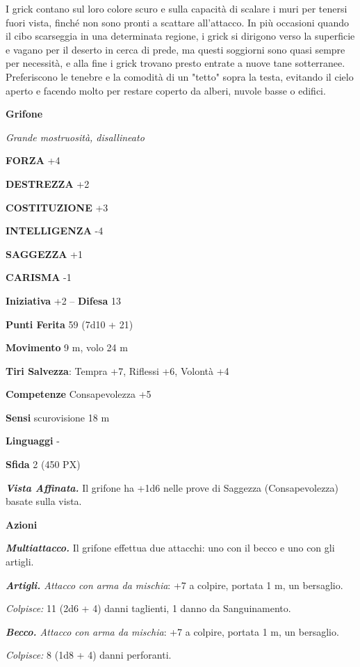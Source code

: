 \begin{multicols}{2}
	I grick contano sul loro colore scuro e sulla capacità di scalare i muri per tenersi fuori vista, finché non sono pronti a scattare all'attacco. In più occasioni quando il cibo scarseggia in una determinata regione, i grick si dirigono verso la superficie e vagano per il deserto in cerca di prede, ma questi soggiorni sono quasi sempre per necessità, e alla fine i grick trovano presto entrate a nuove tane sotterranee. Preferiscono le tenebre e la comodità di un "tetto" sopra la testa, evitando il cielo aperto e facendo molto per restare coperto da alberi, nuvole basse o edifici.


	\medskip{}\textbf{Grifone}

	\textit{Grande mostruosità, disallineato}

	\textbf{FORZA} +4

	\textbf{DESTREZZA} +2

	\textbf{COSTITUZIONE} +3

	\textbf{INTELLIGENZA} -4

	\textbf{SAGGEZZA} +1

	\textbf{CARISMA} -1

	\textbf{Iniziativa} +2 -- \textbf{Difesa} 13

	\textbf{Punti Ferita} 59 (7d10 + 21)

	\textbf{Movimento} 9 m, volo 24 m

	\textbf{Tiri Salvezza}: Tempra +7, Riflessi +6, Volontà +4

	\textbf{Competenze} Consapevolezza +5

	\textbf{Sensi} scurovisione 18 m

	\textbf{Linguaggi} -

	\textbf{Sfida} 2 (450 PX)

	\textit{\textbf{Vista Affinata.}} Il grifone ha +1d6 nelle prove di Saggezza (Consapevolezza) basate sulla vista.

	\textbf{Azioni}

	\textit{\textbf{Multiattacco.}} Il grifone effettua due attacchi: uno con il becco e uno con gli artigli.

	\textit{\textbf{Artigli.} Attacco con arma da mischia}: +7 a colpire, portata 1 m, un bersaglio.

	\textit{Colpisce:} 11 (2d6 + 4) danni taglienti, 1 danno da Sanguinamento.

	\textit{\textbf{Becco.} Attacco con arma da mischia}: +7 a colpire, portata 1 m, un bersaglio.

	\textit{Colpisce:} 8 (1d8 + 4) danni perforanti.


\end{multicols}
